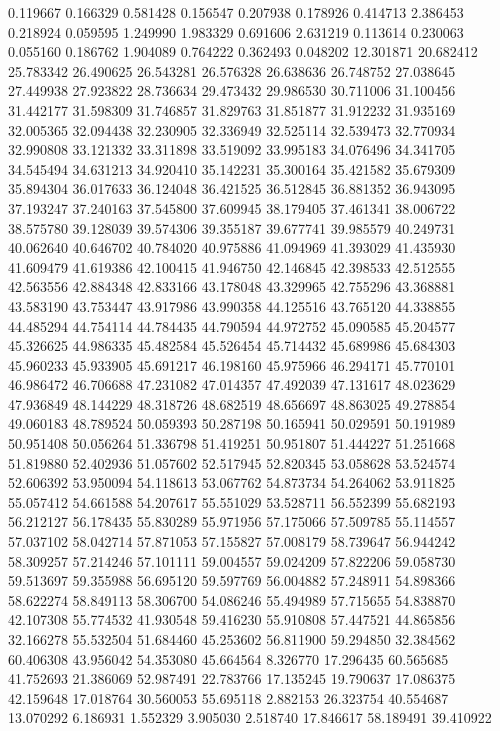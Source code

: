 0.119667
0.166329
0.581428
0.156547
0.207938
0.178926
0.414713
2.386453
0.218924
0.059595
1.249990
1.983329
0.691606
2.631219
0.113614
0.230063
0.055160
0.186762
1.904089
0.764222
0.362493
0.048202
12.301871
20.682412
25.783342
26.490625
26.543281
26.576328
26.638636
26.748752
27.038645
27.449938
27.923822
28.736634
29.473432
29.986530
30.711006
31.100456
31.442177
31.598309
31.746857
31.829763
31.851877
31.912232
31.935169
32.005365
32.094438
32.230905
32.336949
32.525114
32.539473
32.770934
32.990808
33.121332
33.311898
33.519092
33.995183
34.076496
34.341705
34.545494
34.631213
34.920410
35.142231
35.300164
35.421582
35.679309
35.894304
36.017633
36.124048
36.421525
36.512845
36.881352
36.943095
37.193247
37.240163
37.545800
37.609945
38.179405
37.461341
38.006722
38.575780
39.128039
39.574306
39.355187
39.677741
39.985579
40.249731
40.062640
40.646702
40.784020
40.975886
41.094969
41.393029
41.435930
41.609479
41.619386
42.100415
41.946750
42.146845
42.398533
42.512555
42.563556
42.884348
42.833166
43.178048
43.329965
42.755296
43.368881
43.583190
43.753447
43.917986
43.990358
44.125516
43.765120
44.338855
44.485294
44.754114
44.784435
44.790594
44.972752
45.090585
45.204577
45.326625
44.986335
45.482584
45.526454
45.714432
45.689986
45.684303
45.960233
45.933905
45.691217
46.198160
45.975966
46.294171
45.770101
46.986472
46.706688
47.231082
47.014357
47.492039
47.131617
48.023629
47.936849
48.144229
48.318726
48.682519
48.656697
48.863025
49.278854
49.060183
48.789524
50.059393
50.287198
50.165941
50.029591
50.191989
50.951408
50.056264
51.336798
51.419251
50.951807
51.444227
51.251668
51.819880
52.402936
51.057602
52.517945
52.820345
53.058628
53.524574
52.606392
53.950094
54.118613
53.067762
54.873734
54.264062
53.911825
55.057412
54.661588
54.207617
55.551029
53.528711
56.552399
55.682193
56.212127
56.178435
55.830289
55.971956
57.175066
57.509785
55.114557
57.037102
58.042714
57.871053
57.155827
57.008179
58.739647
56.944242
58.309257
57.214246
57.101111
59.004557
59.024209
57.822206
59.058730
59.513697
59.355988
56.695120
59.597769
56.004882
57.248911
54.898366
58.622274
58.849113
58.306700
54.086246
55.494989
57.715655
54.838870
42.107308
55.774532
41.930548
59.416230
55.910808
57.447521
44.865856
32.166278
55.532504
51.684460
45.253602
56.811900
59.294850
32.384562
60.406308
43.956042
54.353080
45.664564
8.326770
17.296435
60.565685
41.752693
21.386069
52.987491
22.783766
17.135245
19.790637
17.086375
42.159648
17.018764
30.560053
55.695118
2.882153
26.323754
40.554687
13.070292
6.186931
1.552329
3.905030
2.518740
17.846617
58.189491
39.410922
